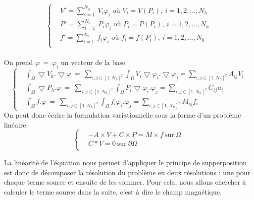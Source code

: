 \documentclass[a4paper,12pt,titlepage]{report}
\begin{document}
\begin{onehalfspace}
\begin{equation*}
  \left\{
    \begin{aligned}
 &V '= \sum_{i=1}^{N_{h}}{\ V_{i}\varphi_{i}} \text{ \ \ où } V_{i} = V(P_{i}),\  i= 1,2,...,N_{h}\\
 &P '= \sum_{i=1}^{N_{h}}{\ P_{i}\varphi_{i}} \text{ \ \ où } P_{i} = P(P_{i}),\  i= 1,2,...,N_{h}\\
 &f' = \sum_{i=1}^{N_{h}}{\ f_{i}\varphi_{i}} \text{ \ \ où } f_{i} = f(P_{i}),\  i= 1,2,...,N_{h}\\
\end{aligned}
  \right.
\end{equation*}$ $ \\ 
On prend $\varphi\ =\ \varphi_{i}$ un vecteur de la base
\begin{equation*}
  \left\{
    \begin{aligned}
	&\int_{\Omega}\bigtriangledown V_{h}.\bigtriangledown \varphi\ 
	=\ 
	\sum_{i, j \in [1, N_{h}]^{2}} \int_{\Omega}V_{i}\bigtriangledown\varphi_{i}. \bigtriangledown\varphi_{j} 
	= 
	\sum_{i,j \in [1, N_{h}]^{2}} A_{ij} V_{i}\\
	&\int_{\Omega}\bigtriangledown P_{h}.\varphi\ 
	=\ 
	\sum_{i, j \in [1, N_{h}]^{2}} \int_{\Omega}P_{i}\bigtriangledown\varphi_{i}. \varphi_{j} 
	= 
	\sum_{i,j \in [1, N_{h}]^{2}}C_{ij} u_{i}\\
	&\int_{\Omega} f. \varphi\ 
	=\ 
	\sum_{i, j \in [1, N_{h}]^{2}} \int_{\Omega}f_{i}\varphi_{i}. \varphi_{j} 
	= 
	\sum_{i,j \in [1, N_{h}]^{2}} M_{ij} f_{i}\end{aligned}
  \right.
\end{equation*}
On peut donc écrire la formulation variationnelle sous la forme d'un problème linéaire:
\begin{equation*}
  \left\{
    \begin{aligned}
	&-A\times V + C \times P = M	\times f \ \text{sur} \ \Omega\\
	& C*V = 0 \ \text{sur} \  \partial\Omega\\
	\end{aligned}
  \right.
\end{equation*}


La linéarité de l'équation nous permet d'appliquer le principe de supperposition est donc de décomposer la résolution du problème en deux résolutions : une pour chaque terme source et ensuite de les sommer.
Pour cela, nous allons chercher à calculer le terme source dans la suite, c'est à dire le champ magnétique.


\end{onehalfspace}
\end{document}
